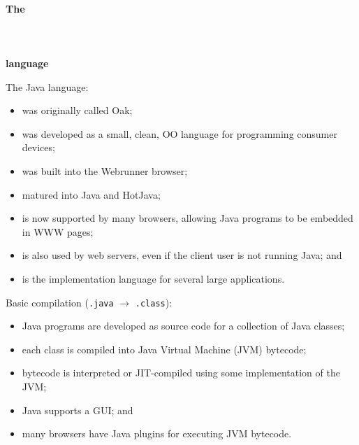 




\begin{slide*}
\begin{tabbing}
~\\
{\Huge\bf The}\\ ~\\\\ ~\\{\Huge\bf language}\\
\end{tabbing}
\vfil
\end{slide*}

\begin{slide*}
The Java language:
\begin{itemize}
\item was originally called Oak;
\item was developed as a small, clean, OO language for programming
     consumer devices;
\item was built into the Webrunner browser;
\item matured into Java and HotJava;
\item is now supported by many browsers, allowing Java programs
     to be embedded in WWW pages;
\item is also used by web servers, even if the client user is not running
  Java; and
\item is the implementation language for several large applications.
\end{itemize}
\vfil
\end{slide*}

\begin{slide*}
Basic compilation ({\tt .java} $\rightarrow$ {\tt .class}):
\begin{itemize}
\item Java programs are developed as source code for a collection of Java classes;
\item each class is compiled into Java Virtual Machine (JVM) bytecode;
\item bytecode is interpreted or JIT-compiled using some implementation of the JVM;
\item Java supports a GUI; and
\item many browsers have Java plugins for executing JVM bytecode.
\end{itemize}
\vfil
\end{slide*}

